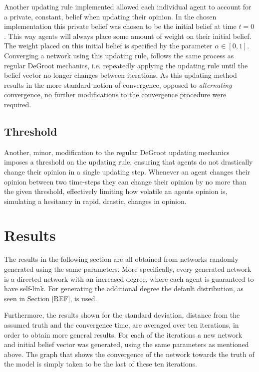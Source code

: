 \documentclass{article}
\begin{document}
Another updating rule implemented allowed each individual agent to account for a private, constant, belief when updating their opinion. In the chosen implementation this private belief was chosen to be the initial belief at time $t=0$. This way agents will always place some amount of weight on their initial belief. The weight placed on this initial belief is specified by the parameter $\alpha \in [0, 1]$. Converging a network using this updating rule, follows the same process as regular DeGroot mechanics, i.e. repeatedly applying the updating rule until the belief vector no longer changes between iterations. As this updating method results in the more standard notion of convergence, opposed to \textit{alternating} convergence, no further modifications to the convergence procedure were required.

\subsection{Threshold}

Another, minor, modification to the regular DeGroot updating mechanics imposes a threshold on the updating rule, ensuring that agents do not drastically change their opinion in a single updating step. Whenever an agent changes their opinion between two time-steps they can change their opinion by no more than the given threshold, effectively limiting how volatile an agents opinion is, simulating a hesitancy in rapid, drastic, changes in opinion.

\newpage

\section{Results}
\label{results}

The results in the following section are all obtained from networks randomly generated using the same parameters. More specifically, every generated network is a directed network with an increased degree, where each agent is guaranteed to have self-link. For generating the additional degree the default distribution, as seen in Section [REF], is used.

\noindent Furthermore, the results shown for the standard deviation, distance from the assumed truth and the convergence time, are averaged over ten iterations, in order to obtain more general results. For each of the iterations a new network and initial belief vector was generated, using the same parameters as mentioned above. The graph that shows the convergence of the network towards the truth of the model is simply taken to be the last of these ten iterations.
\end{document}
